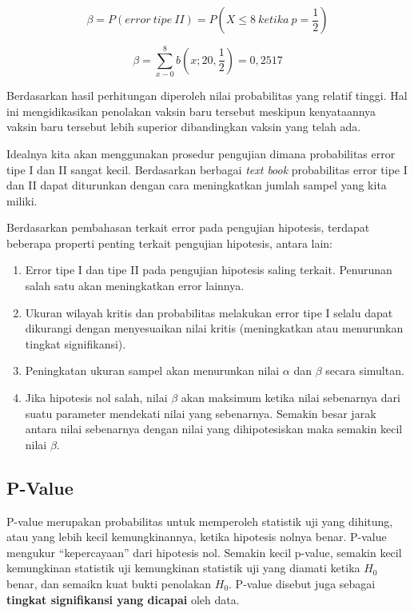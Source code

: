 \documentclass[]{book}
\providecommand{\tightlist}{%
  \setlength{\itemsep}{0pt}\setlength{\parskip}{0pt}}
\begin{document}
\[
\beta =P\left(error\ tipe\ II\right)=P\left(X\le 8\ ketika\ p=\frac{1}{2}\right)
\]

\[
\beta=\sum_{x-0}^8b\left(x;20,\frac{1}{2}\right)=0,2517
\]

Berdasarkan hasil perhitungan diperoleh nilai probabilitas yang relatif
tinggi. Hal ini mengidikasikan penolakan vaksin baru tersebut meskipun
kenyataannya vaksin baru tersebut lebih superior dibandingkan vaksin
yang telah ada.

Idealnya kita akan menggunakan prosedur pengujian dimana probabilitas
error tipe I dan II sangat kecil. Berdasarkan berbagai \emph{text book}
probabilitas error tipe I dan II dapat diturunkan dengan cara
meningkatkan jumlah sampel yang kita miliki.

Berdasarkan pembahasan terkait error pada pengujian hipotesis, terdapat
beberapa properti penting terkait pengujian hipotesis, antara lain:

\begin{enumerate}
\def\labelenumi{\arabic{enumi}.}
\tightlist
\item
  Error tipe I dan tipe II pada pengujian hipotesis saling terkait.
  Penurunan salah satu akan meningkatkan error lainnya.
\item
  Ukuran wilayah kritis dan probabilitas melakukan error tipe I selalu
  dapat dikurangi dengan menyesuaikan nilai kritis (meningkatkan atau
  menurunkan tingkat signifikansi).
\item
  Peningkatan ukuran sampel akan menurunkan nilai \(\alpha\) dan
  \(\beta\) secara simultan.
\item
  Jika hipotesis nol salah, nilai \(\beta\) akan maksimum ketika nilai
  sebenarnya dari suatu parameter mendekati nilai yang sebenarnya.
  Semakin besar jarak antara nilai sebenarnya dengan nilai yang
  dihipotesiskan maka semakin kecil nilai \(\beta\).
\end{enumerate}

\subsection{P-Value}\label{p-value}

P-value merupakan probabilitas untuk memperoleh statistik uji yang
dihitung, atau yang lebih kecil kemungkinannya, ketika hipotesis nolnya
benar. P-value mengukur ``kepercayaan'' dari hipotesis nol. Semakin
kecil p-value, semakin kecil kemungkinan statistik uji kemungkinan
statistik uji yang diamati ketika \(H_0\) benar, dan semaikn kuat bukti
penolakan \(H_0\). P-value disebut juga sebagai \textbf{tingkat
signifikansi yang dicapai} oleh data.
\end{document}
